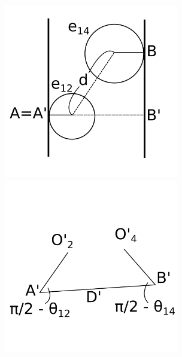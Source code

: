 \documentclass[suppldata, dvipdfmx]{interact}
\theoremstyle{plain}%
\theoremstyle{definition}
\theoremstyle{remark}
\theoremstyle{problemstyle}
\begin{document}
\begin{figure}[h!tbp]
 \begin{minipage}[t]{0.5\textwidth}
  \centering
  \includegraphics[width=3in, height=3in,
  keepaspectratio]{./img/HexahedraWithSphericalFaces/sideSliceDistance.png}
  \caption{}
  \label{fig:sideSliceDistance}
 \end{minipage}
 \hspace*{\fill}
 \begin{minipage}[t]{0.5\textwidth}
  \centering
  \includegraphics[width=3in, height=3in,
  keepaspectratio]{./img/HexahedraWithSphericalFaces/adb.png}
  \caption{}
  \label{fig:adb}
 \end{minipage}
 \hspace*{\fill}
\end{figure}
\end{document}
